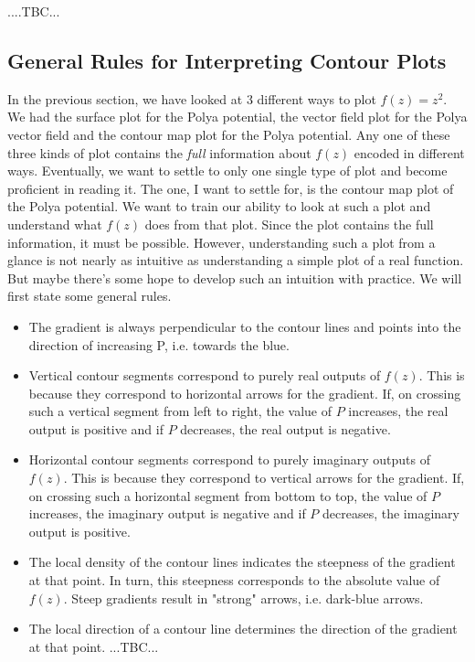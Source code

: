 \documentclass[12pt]{article}
\begin{document}
....TBC...

\subsection{General Rules for Interpreting Contour Plots}
In the previous section, we have looked at 3 different ways to plot $f(z) = z^2$. We had the surface plot for the Polya potential, the vector field plot for the Polya vector field and the contour map plot for the Polya potential. Any one of these three kinds of plot contains the \emph{full} information about $f(z)$ encoded in different ways. Eventually, we want to settle to only one single type of plot and become proficient in reading it. The one, I want to settle for, is the contour map plot of the Polya potential. We want to train our ability to look at such a plot and understand what $f(z)$ does from that plot. Since the plot contains the full information, it must be possible. However, understanding such a plot from a glance is not nearly as intuitive as understanding a simple plot of a real function. But maybe there's some hope to develop such an intuition with practice. We will first state some general rules.

\begin{itemize}
\item The gradient is always perpendicular to the contour lines and points into the direction of increasing P, i.e. towards the blue.
\item Vertical contour segments correspond to purely real outputs of $f(z)$. This is because they correspond to horizontal arrows for the gradient. If, on crossing such a vertical segment from left to right, the value of $P$ increases, the real output is positive and if $P$ decreases, the real output is negative.
\item Horizontal contour segments correspond to purely imaginary outputs of $f(z)$. This is because they correspond to vertical arrows for the gradient. If, on crossing such a horizontal segment from bottom to top, the value of $P$ increases, the imaginary output is negative and if $P$ decreases, the imaginary output is positive.
\item The local density of the contour lines indicates the steepness of the gradient at that point. In turn, this steepness corresponds to the absolute value of $f(z)$. Steep gradients result in "strong" arrows, i.e. dark-blue arrows.
\item The local direction of a contour line determines the direction of the gradient at that point. ...TBC...
\end{itemize}
\end{document}
